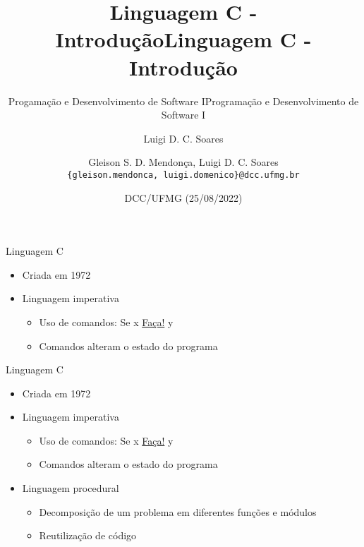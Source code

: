 \documentclass[t, aspectratio=169]{beamer}
\author{Luigi D. C. Soares}
\date{DCC/UFMG (25/08/2022)}
\title{Linguagem C - Introdução}
\subtitle{Progamação e Desenvolvimento de Software I}
\title[Linguagem C]{Linguagem C - Introdução}
\subtitle{Programação e Desenvolvimento de Software I}
\author[\tiny\{gleison.mendonca, luigi.domenico\}@dcc.ufmg.br]{%
Gleison S. D. Mendonça, Luigi D. C. Soares\texorpdfstring{\\}{}
\texttt{\{gleison.mendonca, luigi.domenico\}@dcc.ufmg.br}}
\institute[DCC/UFMG]{}
\date[25/08/2022]{}
\begin{document}
\maketitle

\begin{frame}[label={sec:org3273e32}]{Linguagem C}
\begin{itemize}
\item Criada em 1972

\item Linguagem imperativa
\begin{itemize}
\item Uso de comandos: Se \alert{x} \uline{Faça!} \alert{y}
\item Comandos alteram o estado do programa
\end{itemize}
\end{itemize}
\end{frame}

\begin{frame}[label={sec:org6c7ed8f}]{Linguagem C}
\begin{itemize}
\item Criada em 1972

\item Linguagem imperativa
\begin{itemize}
\item Uso de comandos: Se \alert{x} \uline{Faça!} \alert{y}
\item Comandos alteram o estado do programa
\end{itemize}

\item Linguagem procedural
\begin{itemize}
\item Decomposição de um problema em diferentes funções e módulos
\item Reutilização de código
\end{itemize}
\end{itemize}
\end{frame}
\end{document}
